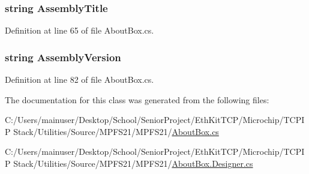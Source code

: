 \subsubsection[{Assembly\+Title}]{\setlength{\rightskip}{0pt plus 5cm}string Assembly\+Title\hspace{0.3cm}{\ttfamily [get]}}\label{class_m_p_f_s21_1_1_about_box_af2a79cddc6558ffaf27887aea18b9284}


Definition at line 65 of file About\+Box.\+cs.

\hypertarget{class_m_p_f_s21_1_1_about_box_acd68f60edf56b113543777b903eaeb65}{}
\subsubsection[{Assembly\+Version}]{\setlength{\rightskip}{0pt plus 5cm}string Assembly\+Version\hspace{0.3cm}{\ttfamily [get]}}\label{class_m_p_f_s21_1_1_about_box_acd68f60edf56b113543777b903eaeb65}


Definition at line 82 of file About\+Box.\+cs.



The documentation for this class was generated from the following files\+:\begin{DoxyCompactItemize}
\item 
C\+:/\+Users/mainuser/\+Desktop/\+School/\+Senior\+Project/\+Eth\+Kit\+T\+C\+P/\+Microchip/\+T\+C\+P\+I\+P Stack/\+Utilities/\+Source/\+M\+P\+F\+S21/\+M\+P\+F\+S21/\hyperlink{_about_box_8cs}{About\+Box.\+cs}\item 
C\+:/\+Users/mainuser/\+Desktop/\+School/\+Senior\+Project/\+Eth\+Kit\+T\+C\+P/\+Microchip/\+T\+C\+P\+I\+P Stack/\+Utilities/\+Source/\+M\+P\+F\+S21/\+M\+P\+F\+S21/\hyperlink{_about_box_8_designer_8cs}{About\+Box.\+Designer.\+cs}\end{DoxyCompactItemize}
